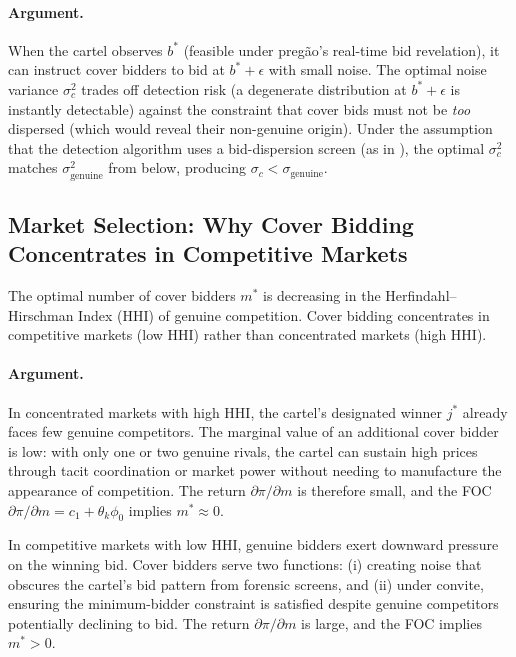 \paragraph{Argument.}
When the cartel observes $b^*$ (feasible under preg\~ao's real-time bid
revelation), it can instruct cover bidders to bid at $b^* + \epsilon$
with small noise. The optimal noise variance $\sigma_c^2$ trades off
detection risk (a degenerate distribution at $b^* + \epsilon$ is
instantly detectable) against the constraint that cover bids must not be
\emph{too} dispersed (which would reveal their non-genuine origin).
Under the assumption that the detection algorithm uses a bid-dispersion
screen (as in \citealt{imhof2019detecting}), the optimal
$\sigma_c^2$ matches $\sigma_{\text{genuine}}^2$ from below, producing
$\sigma_c < \sigma_{\text{genuine}}$.




\subsection{Market Selection: Why Cover Bidding Concentrates in
Competitive Markets}
\label{sec:market_selection}

\begin{proposition}
\label{prop:market_selection}
The optimal number of cover bidders $m^*$ is decreasing in the
Herfindahl--Hirschman Index (HHI) of genuine competition. Cover bidding
concentrates in competitive markets (low HHI) rather than concentrated
markets (high HHI).
\end{proposition}

\paragraph{Argument.}
In concentrated markets with high HHI, the cartel's designated winner
$j^*$ already faces few genuine competitors. The marginal value of an
additional cover bidder is low: with only one or two genuine rivals, the
cartel can sustain high prices through tacit coordination or market
power without needing to manufacture the appearance of competition. The
return $\partial \pi / \partial m$ is therefore small, and the FOC
$\partial \pi / \partial m = c_1 + \theta_k \phi_0$ implies $m^*
\approx 0$.

In competitive markets with low HHI, genuine bidders exert downward
pressure on the winning bid. Cover bidders serve two functions: (i)
creating noise that obscures the cartel's bid pattern from forensic
screens, and (ii) under convite, ensuring the minimum-bidder constraint
is satisfied despite genuine competitors potentially declining to bid.
The return $\partial \pi / \partial m$ is large, and the FOC implies
$m^* > 0$.

